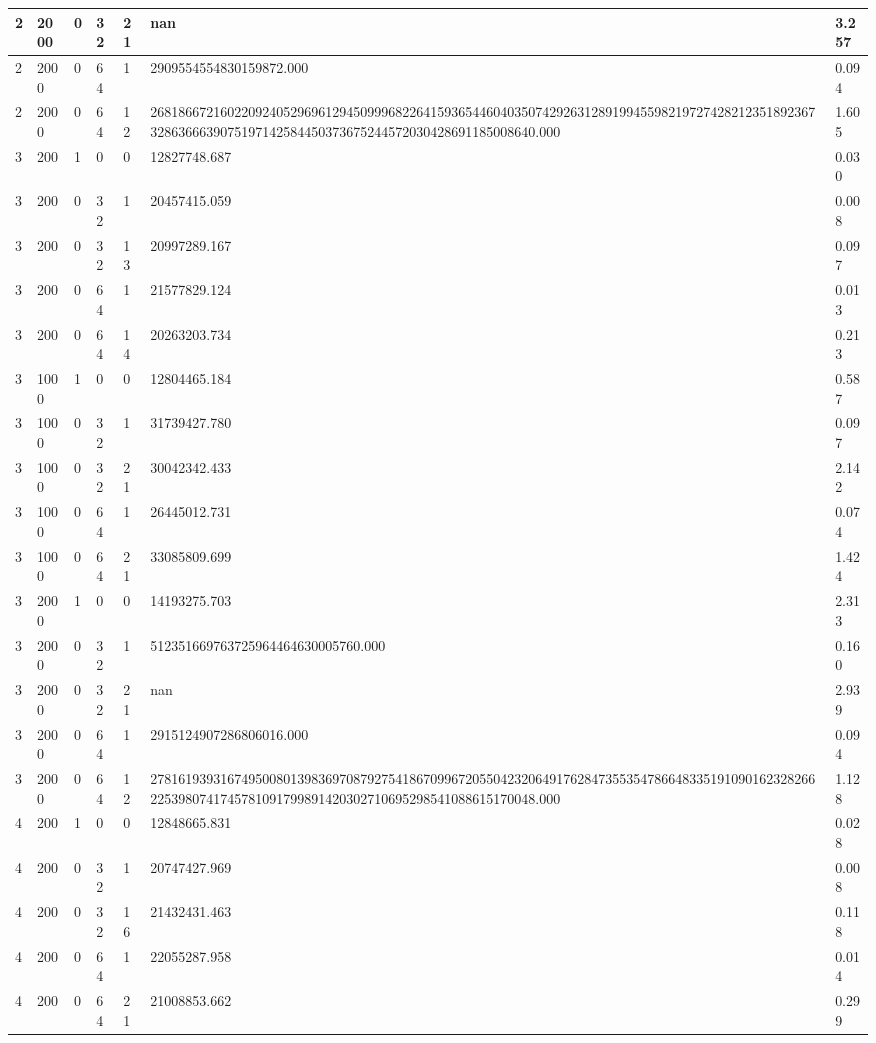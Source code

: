 \begin{table}[!ht]
{\begin{tabular}{|l|l|l|l|l|l|l|}
        2 & 2000 & 0 & 32 & 21 & nan & 3.257 \\ \hline
        2 & 2000 & 0 & 64 & 1 & 2909554554830159872.000 & 0.094 \\ \hline
        2 & 2000 & 0 & 64 & 12 & 268186672160220924052969612945099968226415936544604035074292631289199455982197274282123518923673286366639075197142584450373675244572030428691185008640.000 & 1.605 \\ \hline
        3 & 200 & 1 & 0 & 0 & 12827748.687 & 0.030 \\ \hline
        3 & 200 & 0 & 32 & 1 & 20457415.059 & 0.008 \\ \hline
        3 & 200 & 0 & 32 & 13 & 20997289.167 & 0.097 \\ \hline
        3 & 200 & 0 & 64 & 1 & 21577829.124 & 0.013 \\ \hline
        3 & 200 & 0 & 64 & 14 & 20263203.734 & 0.213 \\ \hline
        3 & 1000 & 1 & 0 & 0 & 12804465.184 & 0.587 \\ \hline
        3 & 1000 & 0 & 32 & 1 & 31739427.780 & 0.097 \\ \hline
        3 & 1000 & 0 & 32 & 21 & 30042342.433 & 2.142 \\ \hline
        3 & 1000 & 0 & 64 & 1 & 26445012.731 & 0.074 \\ \hline
        3 & 1000 & 0 & 64 & 21 & 33085809.699 & 1.424 \\ \hline
        3 & 2000 & 1 & 0 & 0 & 14193275.703 & 2.313 \\ \hline
        3 & 2000 & 0 & 32 & 1 & 512351669763725964464630005760.000 & 0.160 \\ \hline
        3 & 2000 & 0 & 32 & 21 & nan & 2.939 \\ \hline
        3 & 2000 & 0 & 64 & 1 & 2915124907286806016.000 & 0.094 \\ \hline
        3 & 2000 & 0 & 64 & 12 & 278161939316749500801398369708792754186709967205504232064917628473553547866483351910901623282662253980741745781091799891420302710695298541088615170048.000 & 1.128 \\ \hline
        4 & 200 & 1 & 0 & 0 & 12848665.831 & 0.028 \\ \hline
        4 & 200 & 0 & 32 & 1 & 20747427.969 & 0.008 \\ \hline
        4 & 200 & 0 & 32 & 16 & 21432431.463 & 0.118 \\ \hline
        4 & 200 & 0 & 64 & 1 & 22055287.958 & 0.014 \\ \hline
        4 & 200 & 0 & 64 & 21 & 21008853.662 & 0.299 \\ \hline

\end{tabular}}
\end{table}
